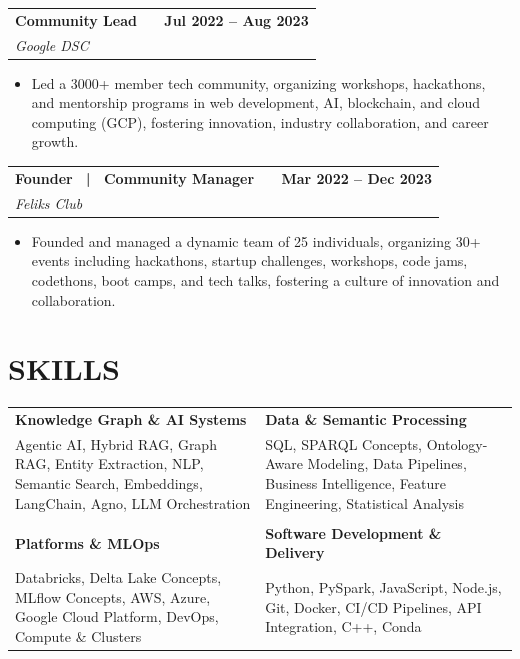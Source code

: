 \documentclass[a4paper,11pt]{article}
\makeatletter
\newcommand{\entryheader}[4]{%
  \begin{tabularx}{\textwidth}{@{}>{\RaggedRight\arraybackslash}X r@{}}
    \textbf{#1} & \textbf{#2} \\
    \textit{#3} & \textit{#4} \\
  \end{tabularx}%
}
\newenvironment{entrybullets}{%
  \begin{minipage}[t]{0.77\textwidth}
    \begin{itemize}[leftmargin=*,label=\textbullet,align=left]
}{%
    \end{itemize}
  \end{minipage}
}
\newcommand{\extlink}{\raisebox{0.2ex}{\scriptsize\faExternalLink*}}
\makeatother
\begin{document}
\vspace{0.25cm}
\newpage
\thispagestyle{secondpage}

\entryheader{Community Lead \ \extlink}{Jul 2022 -- Aug 2023}{Google DSC}{}
\begin{entrybullets}
  \item Led a 3000+ member tech community, organizing workshops, hackathons, and mentorship programs in web development, AI, blockchain, and cloud computing (GCP), fostering innovation, industry collaboration, and career growth.
\end{entrybullets}

\vspace{0.25cm}
\entryheader{Founder \ | \ Community Manager \ \extlink}{Mar 2022 -- Dec 2023}{Feliks Club}{}
\begin{entrybullets}
  \item Founded and managed a dynamic team of 25 individuals, organizing 30+ events including hackathons, startup challenges, workshops, code jams, codethons, boot camps, and tech talks, fostering a culture of innovation and collaboration.
\end{entrybullets}

\section*{SKILLS}
\setlength{\tabcolsep}{10pt}
\renewcommand{\arraystretch}{1.0}
\begin{tabularx}{\textwidth}{@{}>{\RaggedRight\arraybackslash}X >{\RaggedRight\arraybackslash}X@{}}
  \textbf{Knowledge Graph \& AI Systems} & \textbf{Data \& Semantic Processing} \\
  Agentic AI, Hybrid RAG, Graph RAG, Entity Extraction, NLP, Semantic Search, Embeddings, LangChain, Agno, LLM Orchestration &
  SQL, SPARQL Concepts, Ontology-Aware Modeling, Data Pipelines, Business Intelligence, Feature Engineering, Statistical Analysis \\
  \\[-3pt]
  \textbf{Platforms \& MLOps} & \textbf{Software Development \& Delivery} \\
  Databricks, Delta Lake Concepts, MLflow Concepts, AWS, Azure, Google Cloud Platform, DevOps, Compute \& Clusters &
  Python, PySpark, JavaScript, Node.js, Git, Docker, CI/CD Pipelines, API Integration, C++, Conda \\
\end{tabularx}
\end{document}
